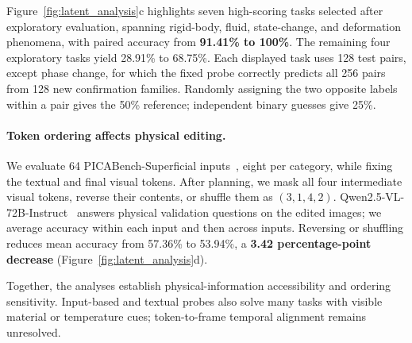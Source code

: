 Figure~\ref{fig:latent_analysis}c highlights seven high-scoring tasks selected after exploratory evaluation, spanning rigid-body, fluid, state-change, and deformation phenomena, with paired accuracy from \textbf{91.41\% to 100\%}.
The remaining four exploratory tasks yield 28.91\% to 68.75\%.
Each displayed task uses 128 test pairs, except phase change, for which the fixed probe correctly predicts all 256 pairs from 128 new confirmation families.
Randomly assigning the two opposite labels within a pair gives the 50\% reference; independent binary guesses give 25\%.

\paragraph{Token ordering affects physical editing.}
We evaluate 64 PICABench-Superficial inputs~\citep{pu2025picabench}, eight per category, while fixing the textual and final visual tokens.
After planning, we mask all four intermediate visual tokens, reverse their contents, or shuffle them as $(3,1,4,2)$.
Qwen2.5-VL-72B-Instruct~\citep{bai2025qwen25vl} answers physical validation questions on the edited images; we average accuracy within each input and then across inputs.
Reversing or shuffling reduces mean accuracy from 57.36\% to 53.94\%, a \textbf{3.42 percentage-point decrease} (Figure~\ref{fig:latent_analysis}d).

Together, the analyses establish physical-information accessibility and ordering sensitivity.
Input-based and textual probes also solve many tasks with visible material or temperature cues; token-to-frame temporal alignment remains unresolved.
